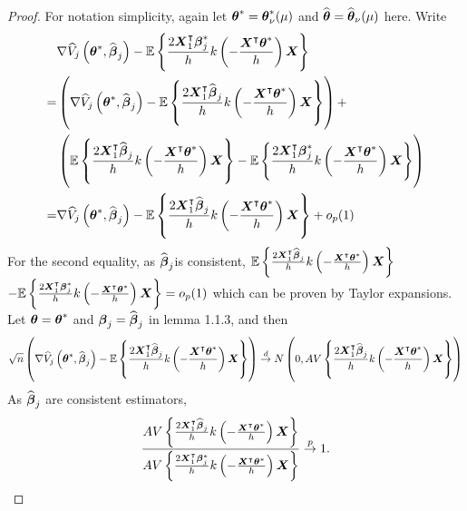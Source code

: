 \begin{proof} For notation simplicity, again let $\boldsymbol{\theta}^* = \boldsymbol{\theta}^*_{\nu}(\mu)$ and $\widehat{\boldsymbol{\theta}} = \widehat{\boldsymbol{\theta}}_{\nu}(\mu)$ here.
Write
\begin{gather*}
\begin{flalign*}
 & \nabla\widehat{V}_j\left(\boldsymbol{\theta}^* , \widehat{\boldsymbol{\beta}}_j\right) - \mathbb{E}\left\{\frac{2\boldsymbol{X}_{1}^{\intercal}\boldsymbol{\beta}^*_j}{h}k\left(-\frac{\boldsymbol{X}^{\intercal}\boldsymbol{\theta}^*}{h}\right)\boldsymbol{X}\right\} \\
=  & \left( \nabla\widehat{V}_j\left(\boldsymbol{\theta}^* , \widehat{\boldsymbol{\beta}}_j\right) - \mathbb{E}\left\{\frac{2\boldsymbol{X}_{1}^{\intercal}\widehat{\boldsymbol{\beta}}_j}{h}k\left(-\frac{\boldsymbol{X}^{\intercal}\boldsymbol{\theta}^*}{h}\right)\boldsymbol{X}\right\} \right) + \\ & \left( \mathbb{E}\left\{\frac{2\boldsymbol{X}_{1}^{\intercal}\widehat{\boldsymbol{\beta}}_j}{h}k\left(-\frac{\boldsymbol{X}^{\intercal}\boldsymbol{\theta}^*}{h}\right)\boldsymbol{X}\right\} - \mathbb{E}\left\{\frac{2\boldsymbol{X}_{1}^{\intercal}\boldsymbol{\beta}^*_j}{h}k\left(-\frac{\boldsymbol{X}^{\intercal}\boldsymbol{\theta}^*}{h}\right)\boldsymbol{X}\right\} \right) \\
=  & \nabla\widehat{V}_j\left(\boldsymbol{\theta}^* , \widehat{\boldsymbol{\beta}}_j\right) - \mathbb{E}\left\{\frac{2\boldsymbol{X}_{1}^{\intercal}\widehat{\boldsymbol{\beta}}_j}{h}k\left(-\frac{\boldsymbol{X}^{\intercal}\boldsymbol{\theta}^*}{h}\right)\boldsymbol{X}\right\}  + o_p(1)
\end{flalign*}
\end{gather*}
For the second equality, as $\widehat{\boldsymbol{\beta}}_j$is consistent, $\mathbb{E}\left\{\frac{2\boldsymbol{X}_{1}^{\intercal}\widehat{\boldsymbol{\beta}}_j}{h}k\left(-\frac{\boldsymbol{X}^{\intercal}\boldsymbol{\theta}^*}{h}\right)\boldsymbol{X}\right\}$\\ $- \mathbb{E}\left\{\frac{2\boldsymbol{X}_{1}^{\intercal}\boldsymbol{\beta}^*_j}{h}k\left(-\frac{\boldsymbol{X}^{\intercal}\boldsymbol{\theta}^*}{h}\right)\boldsymbol{X}\right\} = o_p(1)$ which can be proven by Taylor expansions. Let $\boldsymbol{\theta} = \boldsymbol{\theta}^*$ and $\boldsymbol{\beta}_{j} = \widehat{\boldsymbol{\beta}}_{j}$ in lemma 1.1.3, and then
\begin{gather}
\begin{flalign*}
\sqrt{n}\left(\nabla\widehat{V}_j\left(\boldsymbol{\theta}^* , \widehat{\boldsymbol{\beta}}_j\right) - \mathbb{E}\left\{\frac{2\boldsymbol{X}_{1}^{\intercal}\widehat{\boldsymbol{\beta}}_j}{h}k\left(-\frac{\boldsymbol{X}^{\intercal}\boldsymbol{\theta}^*}{h}\right)\boldsymbol{X}\right\}\right)\overset{d}{\to}N\left(0,AV\left\{\frac{2\boldsymbol{X}_1^{\intercal}\widehat{\boldsymbol{\beta}}_j}{h}k\left(-\frac{\boldsymbol{X}^{\intercal}\boldsymbol{\theta}^*}{h}\right)\boldsymbol{X}\right\}\right)
\end{flalign*}
\end{gather}
As $\widehat{\boldsymbol{\beta}}_{j}$ are consistent estimators,
\begin{gather*}
\frac{AV\lt\{\frac{2\bs{X}_1^{\itl}\widehat{\bs{\beta}}_{j}}{h}k\lt(-\frac{\bs{X}^{\itl}\bs{\theta}^*}{h}\rt)\bs{X}\rt\}}{AV\lt\{\frac{2\bs{X}_1^{\itl}\bs{\beta}^*_{j}}{h}k\lt(-\frac{\bs{X}^{\itl}\bs{\theta}^*}{h}\rt)\bs{X}\rt\}} \overset{p}{\to} 1.

\end{gather*}
\end{proof}
